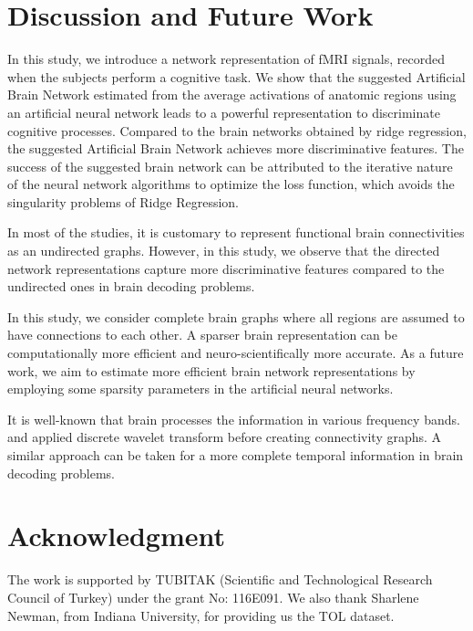 \documentclass[runningheads]{llncs}
\begin{document}

\section{Discussion and Future Work}

In this study, we introduce a network representation of fMRI signals, recorded when the subjects perform a cognitive task. We show that the suggested Artificial Brain Network estimated from the average activations of anatomic regions using an artificial neural network leads to a powerful representation to discriminate cognitive processes. Compared to the brain networks obtained by ridge regression,   the suggested Artificial Brain Network achieves  more discriminative features. The success of the suggested brain network can be attributed to the iterative nature of the neural network algorithms to optimize the loss function, which avoids the singularity problems of Ridge Regression.

In most of the studies, it is customary  to represent functional brain connectivities as an undirected graphs. However, in this study, we observe that the directed network representations capture more discriminative features compared to the undirected ones in brain decoding problems. 

In this study, we  consider complete brain graphs where all regions are assumed to have connections to each other. A sparser brain representation can be computationally more efficient and neuro-scientifically more accurate. As a future work, we aim to estimate more efficient brain network representations by employing some sparsity parameters in the artificial neural networks.


It is well-known that brain processes the information in various frequency bands. \cite{richiardi2011decoding} and \cite{ertugrul2016hierarchical} applied discrete wavelet transform before creating connectivity graphs. A similar approach can be taken for a more complete temporal information in brain decoding problems.

\section{Acknowledgment}
The work is supported by TUBITAK (Scientific and Technological Research Council of Turkey) under the grant No: 116E091. We also thank Sharlene Newman, from Indiana University,  for providing us the TOL dataset.





\end{document}
